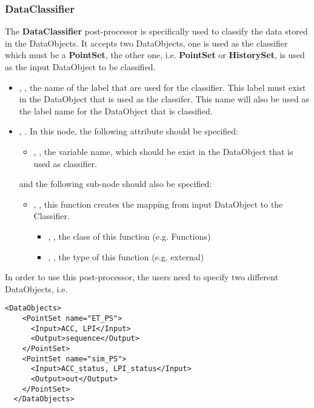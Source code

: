 \subsubsection{DataClassifier}
\label{DataClassifierPP}
The \textbf{DataClassifier} post-processor is specifically used to classify the data stored in the DataObjects. It
accepts two DataObjects, one is used as the classifier which must be a \textbf{PointSet}, the other one,
i.e. \textbf{PointSet} or \textbf{HistorySet}, is used as the input DataObject to be classified.
%
%
\begin{itemize}
  \item {}, , the name of the label that are used for the classifier. This
    label must exist in the DataObject that is used as the classifer. This name will also be used as
    the label name for the DataObject that is classified.
  \item {}, . In this node, the following attribute should be specified:
    \begin{itemize}
      \item {}, , the variable name, which should be exist in
        the DataObject that is used as classifier.
    \end{itemize}
    and the following sub-node should also be specified:
    \begin{itemize}
      \item {}, , this function creates the mapping from input DataObject
        to the Classifier.
        \begin{itemize}
          \item {}, , the class of this function (e.g. Functions)
          \item {}, , the type of this function (e.g. external)
        \end{itemize}
    \end{itemize}
\end{itemize}
%
In order to use this post-processor, the users need to specify two different DataObjects, i.e.
\begin{lstlisting}[style=XML]
  <DataObjects>
    <PointSet name="ET_PS">
      <Input>ACC, LPI</Input>
      <Output>sequence</Output>
    </PointSet>
    <PointSet name="sim_PS">
      <Input>ACC_status, LPI_status</Input>
      <Output>out</Output>
    </PointSet>
  </DataObjects>
\end{lstlisting}
